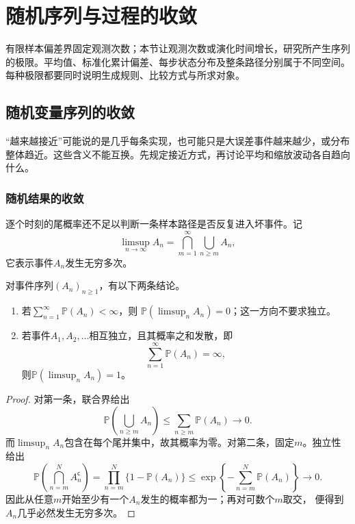 \section{随机序列与过程的收敛}
\label{sec:rv-sequence-process-convergence}
有限样本偏差界固定观测次数；本节让观测次数或演化时间增长，研究所产生序列的极限。平均值、标准化累计偏差、每步状态分布及整条路径分别属于不同空间。每种极限都要同时说明生成规则、比较方式与所求对象。

\subsection{随机变量序列的收敛}
\label{sec:probability-random-convergence-asymptotics}
“越来越接近”可能说的是几乎每条实现，也可能只是大误差事件越来越少，或分布整体趋近。这些含义不能互换。先规定接近方式，再讨论平均和缩放波动各自趋向什么。

\subsubsection{随机结果的收敛}
\label{sec:rv-numerical-convergence}
逐个时刻的尾概率还不足以判断一条样本路径是否反复进入坏事件。记
\[
  \limsup_{n\to\infty}A_n
  =
  \bigcap_{m=1}^{\infty}\bigcup_{n\geq m}A_n,
\]
它表示事件\(A_n\)发生无穷多次。
\begin{theorem}
  \label{thm:probability-borel-cantelli}
  对事件序列\((A_n)_{n\geq1}\)，有以下两条结论。
  \begin{enumerate}
    \item 若\(\sum_{n=1}^{\infty}\mathbb{P}(A_n)<\infty\)，则
    \(\mathbb{P}(\limsup_n A_n)=0\)；这一方向不要求独立。
    \item 若事件\(A_1,A_2,\ldots\)相互独立，且其概率之和发散，即
    \[
      \sum_{n=1}^{\infty}\mathbb{P}(A_n)=\infty,
    \]
    则\(\mathbb{P}(\limsup_n A_n)=1\)。
  \end{enumerate}
\end{theorem}

\begin{proof}
对第一条，联合界给出
\[
  \mathbb{P}\left(\bigcup_{n\geq m}A_n\right)
  \leq\sum_{n\geq m}\mathbb{P}(A_n)\longrightarrow0.
\]
而\(\limsup_n A_n\)包含在每个尾并集中，故其概率为零。对第二条，固定\(m\)。独立性
给出
\[
  \mathbb{P}\left(\bigcap_{n=m}^{N}A_n^{\mathsf c}\right)
  =
  \prod_{n=m}^{N}\{1-\mathbb{P}(A_n)\}
  \leq
  \exp\left\{-\sum_{n=m}^{N}\mathbb{P}(A_n)\right\}
  \longrightarrow0.
\]
因此从任意\(m\)开始至少有一个\(A_n\)发生的概率都为一；再对可数个\(m\)取交，
便得到\(A_n\)几乎必然发生无穷多次。
\end{proof}

